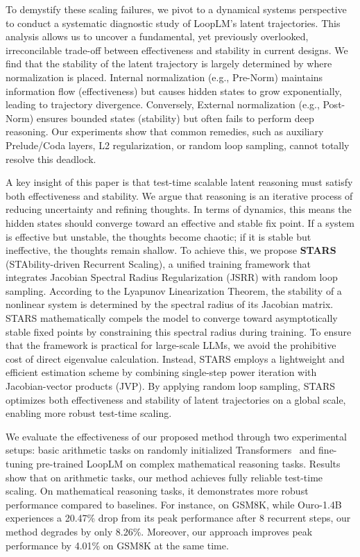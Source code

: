To demystify these scaling failures, we pivot to a dynamical systems perspective to conduct a systematic diagnostic study of LoopLM’s latent trajectories.
This analysis allows us to uncover a fundamental, yet previously overlooked, irreconcilable trade-off between effectiveness and stability in current designs.
We find that the stability of the latent trajectory is largely determined by where normalization is placed. Internal normalization (e.g., Pre-Norm) maintains information flow (effectiveness) but causes hidden states to grow exponentially, leading to trajectory divergence. Conversely, External normalization (e.g., Post-Norm) ensures bounded states (stability) but often fails to perform deep reasoning. Our experiments show that common remedies, such as auxiliary Prelude/Coda layers, L2 regularization, or random loop sampling, cannot totally resolve this deadlock. 

A key insight of this paper is that test-time scalable latent reasoning must satisfy both effectiveness and stability. We argue that reasoning is an iterative process of reducing uncertainty and refining thoughts. In terms of dynamics, this means the hidden states should converge toward an effective and stable fix point. If a system is effective but unstable, the thoughts become chaotic; if it is stable but ineffective, the thoughts remain shallow. 
To achieve this, we propose \textbf{STARS} (STAbility-driven Recurrent Scaling), a unified training framework that integrates Jacobian Spectral Radius Regularization (JSRR) with random loop sampling. According to the Lyapunov Linearization Theorem, the stability of a nonlinear system is determined by the spectral radius of its Jacobian matrix. STARS mathematically compels the model to converge toward asymptotically stable fixed points by constraining this spectral radius during training.
To ensure that the framework is practical for large-scale LLMs, we avoid the prohibitive cost of direct eigenvalue calculation. Instead, STARS employs a lightweight and efficient estimation scheme by combining single-step power iteration with Jacobian-vector products (JVP). By applying random loop sampling, STARS optimizes both effectiveness and stability of latent trajectories on a global scale, enabling more robust test-time scaling.

We evaluate the effectiveness of our proposed method through two experimental setups: basic arithmetic tasks on randomly initialized Transformers~\citep{vaswani2017attention} and fine-tuning pre-trained LoopLM on complex mathematical reasoning tasks. 
Results show that on arithmetic tasks, our method achieves fully reliable test-time scaling. On mathematical reasoning tasks, it demonstrates more robust performance compared to baselines. For instance, on GSM8K, while Ouro-1.4B experiences a 20.47\% drop from its peak performance after 8 recurrent steps, our method degrades by only 8.26\%. Moreover, our approach improves peak performance by 4.01\% on GSM8K at the same time.


